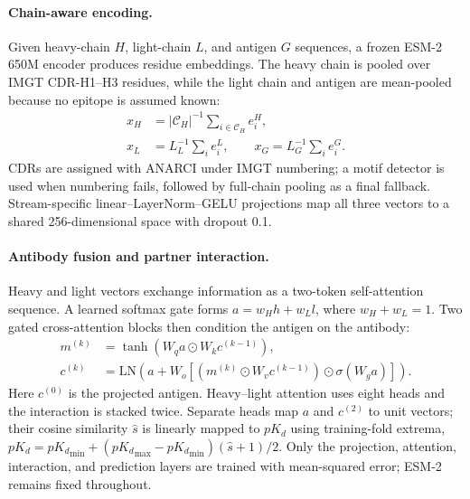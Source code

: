\documentclass{article}
\newcommand{\pkd}{\ensuremath{pK_d}}
\begin{document}
\paragraph{Chain-aware encoding.}
Given heavy-chain $H$, light-chain $L$, and antigen $G$ sequences, a frozen ESM-2 650M encoder produces residue embeddings. The heavy chain is pooled over IMGT CDR-H1--H3 residues, while the light chain and antigen are mean-pooled because no epitope is assumed known:
\begin{equation}
\begin{aligned}
x_H&=|\mathcal C_H|^{-1}\sum_{i\in\mathcal C_H}e_i^H,\\[-1mm]
x_L&=L_L^{-1}\sum_i e_i^L,\qquad x_G=L_G^{-1}\sum_i e_i^G.
\end{aligned}
\label{eq:chain_pooling}
\end{equation}
CDRs are assigned with ANARCI under IMGT numbering; a motif detector is used when numbering fails, followed by full-chain pooling as a final fallback. Stream-specific linear--LayerNorm--GELU projections map all three vectors to a shared 256-dimensional space with dropout 0.1.

\paragraph{Antibody fusion and partner interaction.}
Heavy and light vectors exchange information as a two-token self-attention sequence. A learned softmax gate forms $a=w_Hh+w_Ll$, where $w_H+w_L=1$. Two gated cross-attention blocks then condition the antigen on the antibody:
\begin{equation}
\begin{aligned}
m^{(k)}&=\tanh(W_qa\odot W_kc^{(k-1)}),\\[-1mm]
c^{(k)}&=\mathrm{LN}\!\left(a+W_o[(m^{(k)}\odot W_vc^{(k-1)})\odot\sigma(W_ga)]\right).
\end{aligned}
\label{eq:gated_cross_attention}
\end{equation}
Here $c^{(0)}$ is the projected antigen. Heavy--light attention uses eight heads and the interaction is stacked twice. Separate heads map $a$ and $c^{(2)}$ to unit vectors; their cosine similarity $\hat s$ is linearly mapped to \pkd{} using training-fold extrema, $\pkd={\pkd}_{\min}+({\pkd}_{\max}-{\pkd}_{\min})(\hat s+1)/2$. Only the projection, attention, interaction, and prediction layers are trained with mean-squared error; ESM-2 remains fixed throughout.
\end{document}
